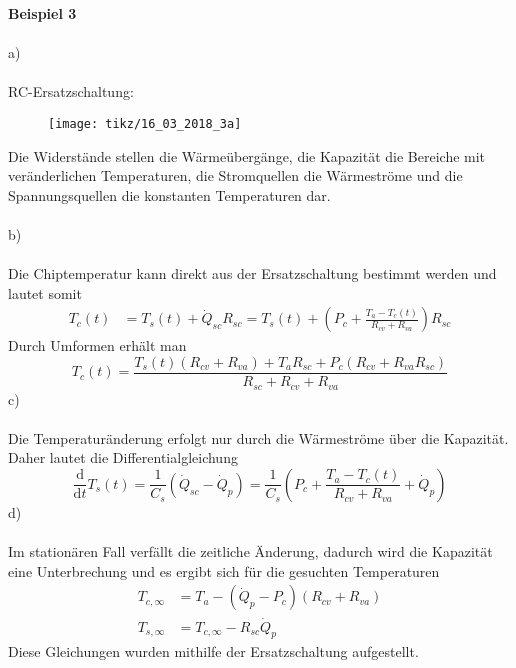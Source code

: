 \textbf{Beispiel 3}\\ \\
a)\\ \\
RC-Ersatzschaltung:
\begin{figure}[h]
	\centering
	\texttt{[image: tikz/16\_03\_2018\_3a]}
\end{figure}
\newline
Die Widerstände stellen die Wärmeübergänge, die Kapazität die Bereiche mit veränderlichen Temperaturen, die Stromquellen die Wärmeströme und die Spannungsquellen die konstanten Temperaturen dar.\\ \\
b)\\ \\
Die Chiptemperatur kann direkt aus der Ersatzschaltung bestimmt werden und lautet somit
\begin{align*}
	T_c(t) &= T_s(t) + \dot{Q}_{sc}R_{sc} = T_s(t) + \left(P_c + \frac{T_a - T_c(t)}{R_{cv} + R_{va}}\right)R_{sc}
\end{align*}
Durch Umformen erhält man
\[
	T_c(t) = \frac{T_s(t)(R_{cv} + R_{va}) + T_aR_{sc} + P_c(R_{cv} + R_{va}R_{sc})}{R_{sc} + R_{cv} + R_{va}}
\]
c)\\ \\
Die Temperaturänderung erfolgt nur durch die Wärmeströme über die Kapazität. Daher lautet die Differentialgleichung
\[
	\frac{\text{d}}{\text{d}t}T_s(t) = \frac{1}{C_s}(\dot{Q}_{sc} - \dot{Q}_p) =  \frac{1}{C_s}\left(P_c + \frac{T_a - T_c(t)}{R_{cv} + R_{va}} + \dot{Q}_p\right)
\]
\newpage
\noindent
d)\\ \\
Im stationären Fall verfällt die zeitliche Änderung, dadurch wird die Kapazität eine Unterbrechung und es ergibt sich für die gesuchten Temperaturen
\begin{align*}
	T_{c,\infty} &= T_a - (\dot{Q}_p - P_c)(R_{cv} + R_{va}) \\
	T_{s,\infty} &= T_{c,\infty} - R_{sc}\dot{Q}_p
\end{align*}
Diese Gleichungen wurden mithilfe der Ersatzschaltung aufgestellt. \\ \\